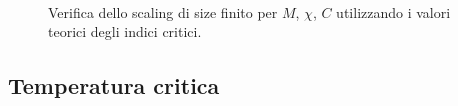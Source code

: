 \documentclass[a4paper,11pt]{article}
\begin{document}
	\begin{figure}[htb]
        \centering
         \\
        \caption{Verifica dello scaling di size finito per $M$, $\chi$, $C$ utilizzando i valori teorici degli indici critici.}
        \label{fig:mchiC_scaling_plot}
	\end{figure}

	
	\subsection{Temperatura critica}
	
\end{document}
